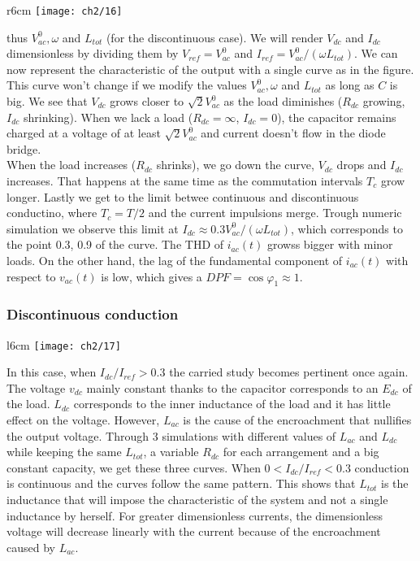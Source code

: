 			\begin{wrapfigure}[8]{r}{6cm}
			\vspace{-5mm}
			\texttt{[image: ch2/16]}
			\end{wrapfigure} 
			thus $V_{ac}^0, \omega$ and $L_{tot}$ (for the discontinuous case). We will render $V_{dc}$ and $I_{dc}$ dimensionless by dividing them by $V_{ref} = V_{ac}^0$ and $I_{ref} = V_{ac}^0/(\omega L_{tot})$. We can now represent the characteristic of the output with a single curve as in the figure. This curve won't change if we modify the values $V_{ac}^0, \omega$ and $L_{tot}$ as long as $C$ is big. We see that $V_{dc}$ grows closer to 
			$\sqrt{2}V_{ac}^0$ as the load diminishes ($R_{dc}$ growing, $I_{dc}$ shrinking). When we lack a load ($R_{dc} = \infty$, $I_{dc} = 0$), the capacitor remains charged at a voltage of at least $\sqrt{2}V_{ac}^0$ and current doesn't flow in the diode bridge. \\
			When the load increases ($R_{dc}$ shrinks), we go down the curve, $V_{dc}$ drops and $I_{dc}$ increases. That happens at the same time as the commutation intervals $T_c$ grow longer. Lastly we get to the limit betwee continuous and discontinuous conductino, where $T_c = T/2$ and the current impulsions merge. Trough numeric simulation we observe this limit at $I_{dc} \approx 0.3 V_{ac}^0/(\omega L_{tot})$, which corresponds to the point {0.3, 0.9} of the curve. The THD of $i_{ac}(t)$ growss bigger with minor loads. On the other hand, the lag of the fundamental component of $i_{ac}(t)$ with respect to $v_{ac}(t)$ is low, which gives a $DPF = \cos \varphi _1 \approx 1$. 
			
		\subsubsection{Discontinuous conduction}
			\begin{wrapfigure}[8]{l}{6cm}
			\vspace{-5mm}
			\texttt{[image: ch2/17]}
			\end{wrapfigure} 
			
			In this case, when $I_{dc}/I_{ref}>0.3$ the carried study becomes pertinent once again. The voltage $v_{dc}$ mainly constant thanks to the capacitor corresponds to an $E_{dc}$ of the load. $L_{dc}$ corresponds to the inner inductance of the load and it has little effect on the voltage. However, $L_{ac}$ is the cause of the encroachment that nullifies the output voltage. Through 3 simulations with different values of $L_{ac}$ and $L_{dc}$ while keeping the same $L_{tot}$, a variable $R_{dc}$ for each arrangement and a big constant capacity, we get these three curves. When $0<I_{dc}/I_{ref}<0.3$ conduction is continuous and the curves follow the same pattern. This shows that $L_{tot}$ is the inductance that will impose the characteristic of the system and not a single inductance by herself. For greater dimensionless currents, the dimensionless voltage will decrease linearly with the current because of the encroachment caused by $L_{ac}$.
			
